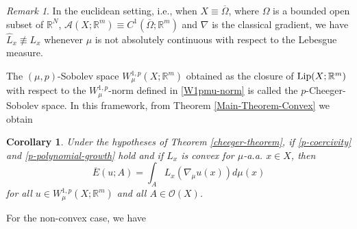 \documentclass[10pt]{amsart}
\numberwithin{equation}{section}
\newtheorem{corollary}[theorem]{Corollary}
\theoremstyle{definition}
\theoremstyle{remark}
\newtheorem{remark}[theorem]{Remark}
\begin{document}
\begin{remark}
In the euclidean setting, i.e., when $X\equiv\overline{\Omega}$, where $\Omega$ is a bounded open subset of ${{\mathbb R}}^N$, $\mathcal{A}(X;{{\mathbb R}}^m)\equiv C^1(\overline{\Omega};{{\mathbb R}}^m)$ and $\nabla$ is the classical gradient, we have $\widehat{L}_x\not\equiv L_x$ whenever $\mu$ is not absolutely continuous with respect to the Lebesgue measure.
\end{remark}

The $(\mu,p)$-Sobolev space $W^{1,p}_\mu(X;{{\mathbb R}}^m)$ obtained as the closure of ${\rm Lip}(X;{{\mathbb R}}^m)$ with respect to the $W^{1,p}_\mu$-norm defined in \eqref{W1pmu-norm} is called the $p$-Cheeger-Sobolev space. In this framework, from Theorem \ref{Main-Theorem-Convex} we obtain

\begin{corollary}\label{coro-Cheeger-1}
Under the hypotheses of Theorem {\rm\ref{cheeger-theorem}}, if  \eqref{p-coercivity} and \eqref{p-polynomial-growth} hold and if $L_x$ is convex for $\mu$-a.a. $x\in X$, then
$$
\overline{E}(u;A)=\int_A L_x(\nabla_\mu u(x))d\mu(x)
$$
for all $u\in W^{1,p}_\mu(X;{{\mathbb R}}^m)$ and all $A\in\mathcal{O}(X)$.
\end{corollary} 

For the non-convex case, we have
\end{document}
